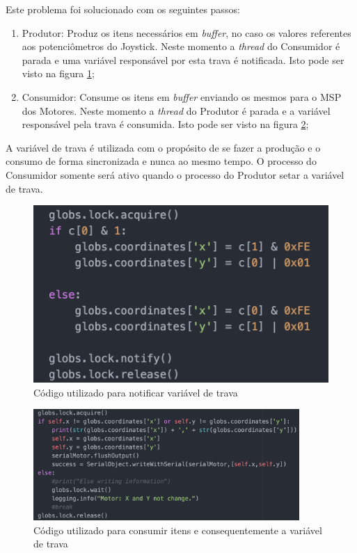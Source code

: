   Este problema foi solucionado com os seguintes passos:
  \begin{enumerate}
    \item Produtor: Produz os itens necessários em \textit{buffer}, no caso os valores referentes aos potenciômetros do Joystick. Neste momento a \textit{thread} do Consumidor é parada e uma variável responsável por esta trava é notificada. Isto pode ser visto na figura \ref{fig:joy_lock};
    \item Consumidor: Consume os itens em \textit{buffer} enviando os mesmos para o MSP dos Motores. Neste momento a \textit{thread} do Produtor é parada e a variável responsável pela trava é consumida. Isto pode ser visto na figura \ref{fig:motor_lock};
  \end{enumerate}

  A variável de trava é utilizada com o propósito de se fazer a produção e o consumo de forma sincronizada e nunca ao mesmo tempo. O processo do Consumidor somente será ativo quando o processo do Produtor setar a variável de trava.

  \begin{figure}[!htb]
  \centering
  \includegraphics[keepaspectratio=true,scale=0.5]{figuras/resultados/joy_lock}
  \caption{Código utilizado para notificar variável de trava}
  \label{fig:joy_lock}
  \end{figure}

  \begin{figure}[!htb]
  \centering
  \includegraphics[width=0.9\textwidth]{figuras/resultados/motor_lock}
  \caption{Código utilizado para consumir itens e consequentemente a variável de trava}
  \label{fig:motor_lock}
  \end{figure}

